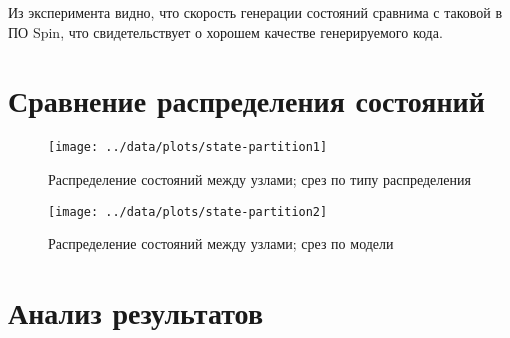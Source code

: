 Из эксперимента видно, что скорость генерации состояний сравнима с таковой в ПО Spin, что
свидетельствует о хорошем качестве генерируемого кода.

\section{Сравнение распределения состояний}
\label{sec:experiment-partition-cmp}

\begin{figure}[p]
  \centering
  \texttt{[image: ../data/plots/state-partition1]}
  \caption{Распределение состояний между узлами; срез по типу распределения}
  \label{fig:state-partition1}
\end{figure}

\begin{figure}[p]
  \centering
  \texttt{[image: ../data/plots/state-partition2]}
  \caption{Распределение состояний между узлами; срез по модели}
  \label{fig:state-partition2}
\end{figure}

\section{Анализ результатов}
\label{sec:experiment-analysis}

